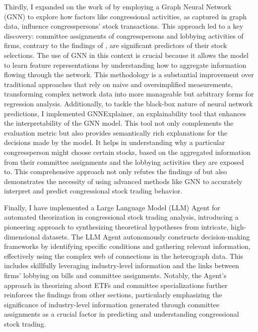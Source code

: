 \documentclass[15pt,letterpaper]{article}
\begin{document}
Thirdly, I expanded on the work of \cite{eg14} by employing a Graph Neural Network (GNN) to explore how factors like congressional activities, as captured in graph data, influence congresspersons' stock transactions. This approach led to a key discovery: committee assignments of congresspersons and lobbying activities of firms, contrary to the findings of \cite{eg14}, are significant predictors of their stock selections. The use of GNN in this context is crucial because it allows the model to learn feature representations by understanding how to aggregate information flowing through the network. This methodology is a substantial improvement over traditional approaches that rely on naive and oversimplified measurements, transforming complex network data into more manageable but arbitrary forms for regression analysis.
Additionally, to tackle the black-box nature of neural network predictions, I implemented GNNExplainer, an explainability tool that enhances the interpretability of the GNN model. This tool not only complements the evaluation metric but also provides semantically rich explanations for the decisions made by the model. It helps in understanding why a particular congressperson might choose certain stocks, based on the aggregated information from their committee assignments and the lobbying activities they are exposed to. This comprehensive approach not only refutes the findings of \cite{eg14} but also demonstrates the necessity of using advanced methods like GNN to accurately interpret and predict congressional stock trading behavior.

Finally, I have implemented a Large Language Model (LLM) Agent for automated theorization in congressional stock trading analysis, introducing a pioneering approach to synthesizing theoretical hypotheses from intricate, high-dimensional datasets. The LLM Agent autonomously constructs decision-making frameworks by identifying specific conditions and gathering relevant information, effectively using the complex web of connections in the heterograph data. This includes skillfully leveraging industry-level information and the links between firms' lobbying on bills and committee assignments. Notably, the Agent's approach in theorizing about ETFs and committee specializations further reinforces the findings from other sections, particularly emphasizing the significance of industry-level information generated through committee assignments as a crucial factor in predicting and understanding congressional stock trading. 
\end{document}
